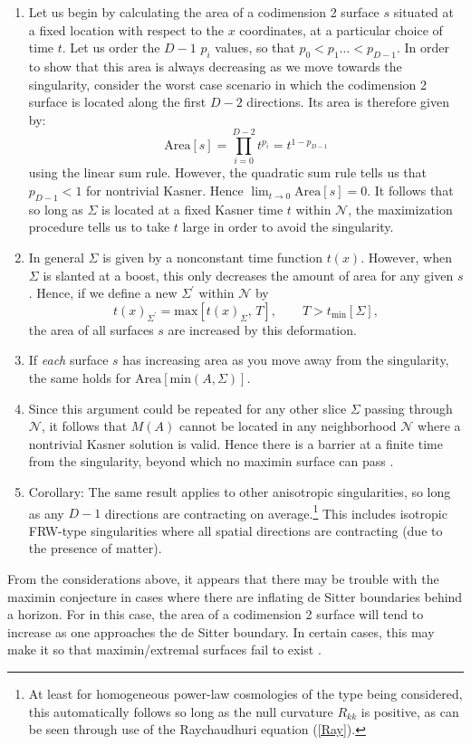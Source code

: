 \documentclass{article}
\begin{document}
\begin{enumerate}[resume]
\begin{enumerate}
	\item Let us begin by calculating the area of a codimension 2 surface $s$ situated at a fixed
location with respect to the $x$ coordinates, at a particular choice of time $t$.  Let us order the $D-1$ $p_i$ values, so that $p_0 < p_1 \ldots < p_{D-1}$.  In order to show that this area is always decreasing as we move towards the singularity, consider the worst case scenario in which the codimension 2 surface is located along the first $D-2$ directions.  Its area is therefore given by:
\begin{equation}
\mathrm{Area}[s] = \prod_{i = 0}^{D-2} t^{p_i} = t^{1 - p_{D-1}}
\end{equation}
using the linear sum rule.  However, the quadratic sum rule tells us that $p_{D-1} < 1$ for nontrivial Kasner.  Hence $\lim_{t \to 0} \mathrm{Area}[s] = 0$.  It follows that so long as $\Sigma$ is located at a fixed Kasner time $t$ within $\mathcal{N}$, the maximization procedure tells us to take $t$ large in order to avoid the singularity.
	\item In general $\Sigma$ is given by a nonconstant time function $t(x)$.  However, when $\Sigma$ is slanted at a boost, this only decreases the amount of area for any given $s$.  Hence, if we define a new $\Sigma^\prime$ within $\mathcal{N}$ by
\begin{equation}
t(x)_{\Sigma^\prime} = \mathrm{max}[t(x)_\Sigma,\,T], \qquad T > t_\mathrm{min}[\Sigma],
\end{equation}
the area of all surfaces $s$ are increased by this deformation.
	\item If \emph{each} surface $s$ has increasing area as you move away from the singularity, the same holds for $\mathrm{Area}[\mathrm{min}(A,\Sigma)]$.
	\item Since this argument could be repeated for any other slice $\Sigma$ passing through $\mathcal{N}$, it follows that $M(A)$ cannot be located in any neighborhood $\mathcal{N}$ where a nontrivial Kasner solution is valid.  Hence there is a barrier at a finite time from the singularity, beyond which no maximin surface can pass \cite{barriers}.
	\item Corollary: The same result applies to other anisotropic singularities, so long as any $D-1$ directions are contracting on average.\footnote{At least for homogeneous power-law cosmologies of the type being considered, this automatically follows so long as the null curvature $R_{kk}$ is positive, as can be seen through use of the Raychaudhuri equation (\ref{Ray}).} This includes isotropic FRW-type singularities where all spatial directions are contracting (due to the presence of matter).
	\end{enumerate}
\end{enumerate}
From the considerations above, it appears that there may be trouble with the maximin conjecture in cases where there are inflating de Sitter boundaries behind a horizon.  For in this case, the area of a codimension 2 surface will tend to increase as one approaches the de Sitter boundary.  In certain cases, this may make it so that maximin/extremal surfaces fail to exist \cite{FM14}.
\end{document}
